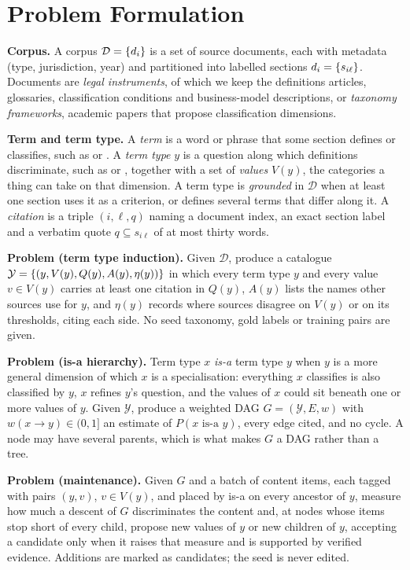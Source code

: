 \section{Problem Formulation}
\label{sec:problem}

\textbf{Corpus.} A corpus $\mathcal{D} = \{d_i\}$ is a set of source documents, each with metadata (type, jurisdiction, year) and partitioned into labelled sections $d_i = \{s_{i\ell}\}$. Documents are
\emph{legal instruments}, of which we keep the definitions articles,
glossaries, classification conditions and business-model descriptions, or
\emph{taxonomy frameworks}, academic papers that propose classification
dimensions.

\textbf{Term and term type.} A \emph{term} is a word or phrase that some section
defines or classifies, such as  or . A \emph{term type} $y$ is a question along which definitions
discriminate, such as  or ,
together with a set of \emph{values} $V(y)$, the categories a thing can take on
that dimension. A term type is \emph{grounded} in $\mathcal{D}$ when at least one
section uses it as a criterion, or defines several terms that differ along it.
A \emph{citation} is a triple $(i, \ell, q)$ naming a document index, an exact
section label and a verbatim quote $q \subseteq s_{i\ell}$ of at most thirty
words.

\textbf{Problem (term type induction).} Given $\mathcal{D}$, produce a catalogue
$\mathcal{Y} = \{(y, V(y), Q(y), A(y), \eta(y))\}$ in which every term type $y$
and every value $v \in V(y)$ carries at least one citation in $Q(y)$, $A(y)$
lists the names other sources use for $y$, and $\eta(y)$ records where sources
disagree on $V(y)$ or on its thresholds, citing each side. No seed taxonomy, gold
labels or training pairs are given.

\textbf{Problem (is-a hierarchy).} Term type $x$ \emph{is-a} term type $y$ when
$y$ is a more general dimension of which $x$ is a specialisation: everything $x$
classifies is also classified by $y$, $x$ refines $y$'s question, and the values
of $x$ could sit beneath one or more values of $y$. Given $\mathcal{Y}$, produce a
weighted DAG $G = (\mathcal{Y}, E, w)$ with $w(x \to y) \in (0, 1]$ an estimate of
$P(x \text{ is-a } y)$, every edge cited, and no cycle. A node may have several
parents, which is what makes $G$ a DAG rather than a tree.

\textbf{Problem (maintenance).} Given $G$ and a batch of content items, each
tagged with pairs $(y, v)$, $v \in V(y)$, and placed by is-a on every ancestor
of $y$, measure how much a descent of $G$ discriminates the content and, at
nodes whose items stop short of every child, propose new values of $y$ or new
children of $y$, accepting a candidate only when it raises that measure and
is supported by verified evidence. Additions are marked as candidates; the seed is
never edited.

